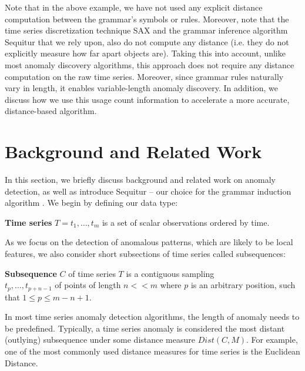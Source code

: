\documentclass{llncs}
\begin{document}
Note that in the above example, we have not used any explicit distance computation between the grammar's symbols or rules. Moreover, note that the time series discretization technique SAX \cite{sax} and the grammar inference algorithm Sequitur \cite{sequitur} that we rely upon, also do not compute any distance (i.e. they do not explicitly measure how far apart objects are). Taking this into account, unlike most anomaly discovery algorithms, this approach does not require any distance computation on the raw time series. Moreover, since grammar rules naturally vary in length, it enables variable-length anomaly discovery. In addition, we discuss how we use this usage count information to accelerate a more accurate, distance-based algorithm.

\section{Background and Related Work}
In this section, we briefly discuss background and related work on anomaly detection, as well as introduce Sequitur -- our choice for the grammar induction algorithm \cite{sequitur}. We begin by defining our data type:


\begin{definition}
\textbf{Time series} $T = t_{1},\dots,t_{m}$ is a set of scalar observations ordered by time.
\end{definition}
As we focus on the detection of anomalous patterns, which are likely to be local features, we also consider short subsections of time series called subsequences: 
\begin{definition}
\textbf{Subsequence} $C$ of time series $T$ is a contiguous sampling \\$t_{p},\dots,t_{p+n-1}$ of points 
of length $n << m$ where $p$ is an arbitrary position, such that $ 1 \leq p \leq m - n + 1$.
\end{definition}

In most time series anomaly detection algorithms, the length of anomaly needs to be predefined. Typically, a time series anomaly is considered the most distant (outlying) subsequence under some distance measure $Dist(C,M)$. For example, one of the most commonly used distance measures for time series is the Euclidean Distance. 
\end{document}
